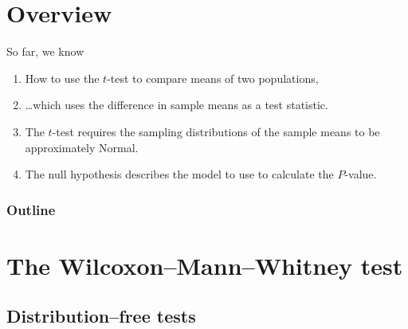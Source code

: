 %
%
%



\subtitle{and nonparametric testing}

\date{24 March 2015}





\begin{frame}
  \maketitle
\end{frame}


\section*{Overview}

\begin{frame}{So far, we know}
  \begin{enumerate}
    \item How to use the $t$-test to compare means of two populations,
    \item \ldots which uses the difference in sample means as a test statistic.
    \item The $t$-test requires the sampling distributions of the sample means to be approximately Normal.
    \item The null hypothesis describes the model to use to calculate the $P$-value.
  \end{enumerate}
\end{frame}

\begin{frame}\frametitle<presentation>{Outline}
  \tableofcontents
\end{frame}



\section{The Wilcoxon--Mann--Whitney test}

\subsection{Distribution--free tests}

